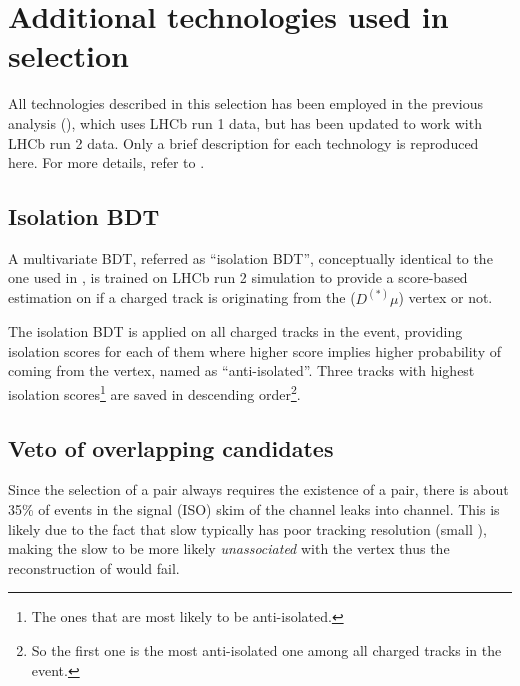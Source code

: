 \section{Additional technologies used in selection}
\label{ref:sel:tech}

All technologies described in this selection has been employed in the previous
analysis (\cite{LHCb-ANA-2020-056}), which uses LHCb run 1 data, but has been
updated to work with LHCb run 2 data.
Only a brief description for each technology is reproduced here.
For more details, refer to \cite{LHCb-ANA-2014-052,LHCb-ANA-2020-056}.

\subsection{Isolation BDT}
\label{ref:sel:tech:iso-bdt}

A multivariate BDT, referred as ``isolation BDT'',
conceptually identical to the one used in \cite{LHCb-ANA-2020-056},
is trained on LHCb run 2 simulation
to provide a score-based estimation on if a charged track is originating from
the \B ($D^{(*)}\mu$) vertex or not.

The isolation BDT is applied on all charged tracks in the event,
providing isolation scores for each of them where
higher score implies higher probability of coming from the \B vertex, named as
``anti-isolated''.
Three tracks with highest isolation scores\footnote{
    The ones that are most likely to be anti-isolated.
} are saved in descending order\footnote{
    So the first one is the most anti-isolated one among all charged tracks
    in the event.
}.


\subsection{Veto of overlapping candidates}
\label{ref:sel:tech:veto}

Since the selection of a \Dstar\muon pair always requires the existence
of a \Dz\muon pair,
there is about 35\% of events in the signal (ISO) skim of the \Dstar channel
leaks into \Dz channel.
This is likely due to the fact that slow \pion typically has poor tracking
resolution (small \ipChiSq), making the slow \pion to be more likely
\emph{unassociated} with the \Dz\mun vertex thus the reconstruction of \Dstar
would fail.

